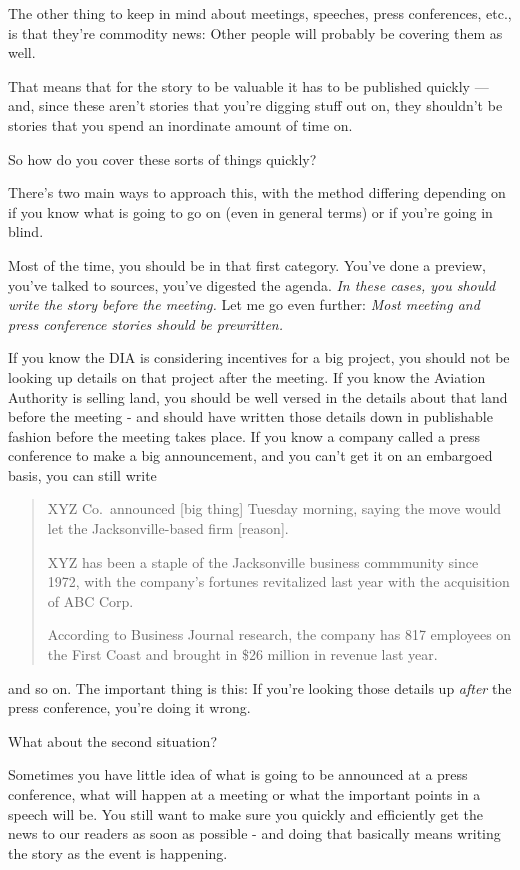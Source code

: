 \documentclass[
  11pt,
  american,
  letterpaperpaper,
  extrafontsizes,onecolumn,openright
  ]{memoir}
\begin{document}
The other thing to keep in mind about meetings, speeches, press conferences, etc., is that they're commodity news: Other people will probably be covering them as well.

That means that for the story to be valuable it has to be published quickly --- and, since these aren't stories that you're digging stuff out on, they shouldn't be stories that you spend an inordinate amount of time on.

So how do you cover these sorts of things quickly?

There's two main ways to approach this, with the method differing depending on if you know what is going to go on (even in general terms) or if you're going in blind.

Most of the time, you should be in that first category. You've done a preview, you've talked to sources, you've digested the agenda. \emph{In these cases, you should write the story before the meeting.} Let me go even further: \emph{Most meeting and press conference stories should be prewritten.}

If you know the DIA is considering incentives for a big project, you should not be looking up details on that project after the meeting. If you know the Aviation Authority is selling land, you should be well versed in the details about that land before the meeting - and should have written those details down in publishable fashion before the meeting takes place. If you know a company called a press conference to make a big announcement, and you can't get it on an embargoed basis, you can still write

\begin{quote}
XYZ Co.~announced {[}big thing{]} Tuesday morning, saying the move would let the Jacksonville-based firm {[}reason{]}.

XYZ has been a staple of the Jacksonville business commmunity since 1972, with the company's fortunes revitalized last year with the acquisition of ABC Corp.~

According to Business Journal research, the company has 817 employees on the First Coast and brought in \$26 million in revenue last year.
\end{quote}

and so on. The important thing is this: If you're looking those details up \emph{after} the press conference, you're doing it wrong.

What about the second situation?

Sometimes you have little idea of what is going to be announced at a press conference, what will happen at a meeting or what the important points in a speech will be. You still want to make sure you quickly and efficiently get the news to our readers as soon as possible - and doing that basically means writing the story as the event is happening.
\end{document}
